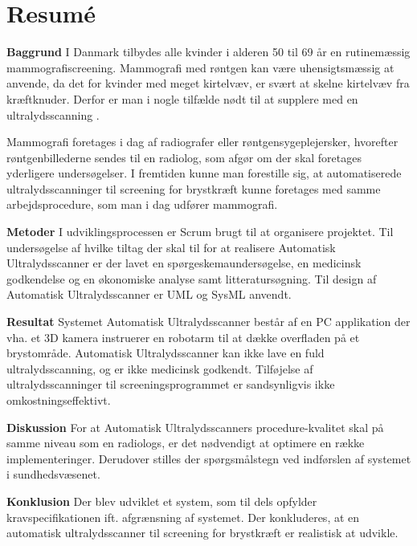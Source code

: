 \chapter{Resumé}
\textbf{Baggrund} \newline
I Danmark tilbydes alle kvinder i alderen 50 til 69 år en rutinemæssig mammografiscreening. Mammografi med røntgen kan være uhensigtsmæssig at anvende, da det for kvinder med meget kirtelvæv, er svært at skelne kirtelvæv fra kræftknuder. Derfor er man i nogle tilfælde nødt til at supplere med en ultralydsscanning \cite{Ultralyd}.

Mammografi foretages i dag af radiografer eller røntgensygeplejersker, hvorefter røntgenbillederne sendes til en radiolog, som afgør om der skal foretages yderligere undersøgelser. I fremtiden kunne man forestille sig, at automatiserede ultralydsscanninger til screening for brystkræft kunne foretages med samme arbejdsprocedure, som man i dag udfører mammografi.

\textbf{Metoder} \newline
I udviklingsprocessen er Scrum brugt til at organisere projektet. Til undersøgelse af hvilke tiltag der skal til for at realisere Automatisk Ultralydsscanner er der lavet en spørgeskemaundersøgelse, en medicinsk godkendelse og en økonomiske analyse samt litteratursøgning. Til design af Automatisk Ultralydsscanner er UML og SysML anvendt. 

\textbf{Resultat} \newline
Systemet Automatisk Ultralydsscanner består af en PC applikation der vha. et 3D kamera instruerer en robotarm til at dække overfladen på et brystområde. Automatisk Ultralydsscanner kan ikke lave en fuld ultralydsscanning, og er ikke medicinsk godkendt. Tilføjelse af ultralydsscanninger til screeningsprogrammet er sandsynligvis ikke omkostningseffektivt.

\textbf{Diskussion} \newline
For at Automatisk Ultralydsscanners procedure-kvalitet skal på samme niveau som en radiologs, er det nødvendigt at optimere en række implementeringer. Derudover stilles der spørgsmålstegn ved indførslen af systemet i sundhedsvæsenet.

\textbf{Konklusion} \newline
Der blev udviklet et system, som til dels opfylder kravspecifikationen ift. afgrænsning af systemet. Der konkluderes, at en automatisk ultralydsscanner til screening for brystkræft er realistisk at udvikle.